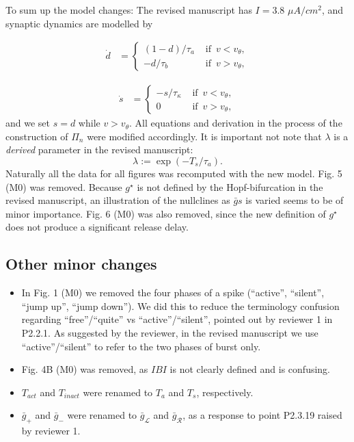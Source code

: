 \documentclass[utf8]{article}
\newcounter{point}[section]
\begin{document}
To sum up the model changes:
The revised manuscript has $I=3.8$ $\si{\mu A/cm^2}$, and synaptic dynamics are modelled by

\begin{align*}
	\dot d & =
	\begin{cases}
		(1-d)/\tau_{a} & \text{ if }\, v<v_{\theta}, \\
		-d/\tau_{b}    & \text{ if }\, v>v_{\theta},
	\end{cases}
\end{align*}

\begin{align*}
	\dot s & =
	\begin{cases}
		-s/\tau_{\kappa} & \text{ if }\, v<v_{\theta}, \\
		0                & \text{ if }\, v>v_{\theta},
	\end{cases}
\end{align*}
and we set $s=d$ while $v>v_{\theta}$.
All equations and derivation in the process of the construction of $\Pi_n$ were modified accordingly.
It is important not note that $\lambda$ is a \textit{derived} parameter in the revised manuscript:
\begin{equation}
\lambda := \exp(-T_s/\tau_a).
\end{equation}
Naturally all the data for all figures was recomputed with the new model.
Fig. 5 (M0) was removed.
Because $g^\star$ is not defined by the Hopf-bifurcation in the revised manuscript, an illustration of the nullclines as $\bar g s$ is varied seems to be of minor importance.
Fig. 6 (M0) was also removed, since the new definition of $g^\star$ does not produce a significant release delay.

\subsection{Other minor changes}

\begin{itemize}
	\item In Fig. 1 (M0) we removed the four phases of a spike (``active'', ``silent'', ``jump up'', ``jump down''). We did this to reduce the terminology confusion regarding ``free''/``quite'' vs ``active''/``silent'', pointed out by reviewer 1 in P2.2.1. As suggested by the reviewer, in the revised manuscript we use ``active''/``silent'' to refer to the two phases of burst only.
	\item Fig. 4B (M0) was removed, as $IBI$ is not clearly defined and is confusing.
	\item $T_{act}$ and $T_{inact}$ were renamed to $T_a$ and $T_s$, respectively.
	\item $\bar g_{+}$ and $\bar g_{-}$ were renamed to $\bar g_{\mathcal{L}}$ and $\bar g_{\mathcal{R}}$, as a response to point P2.3.19 raised by reviewer 1.
\end{itemize}
\end{document}
